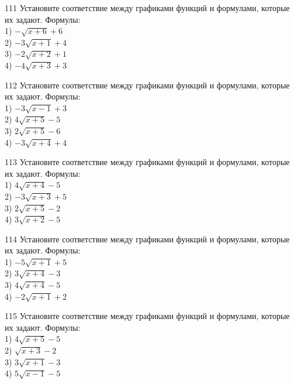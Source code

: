 \documentclass[4apaper]{article}
\begin{document}
\begin{taskBN}{111}
Установите соответствие между графиками функций и формулами, которые их задают. Формулы: \\1) $-\sqrt{x+6}+6$\\2) $-3\sqrt{x+1}+4$\\3) $-2\sqrt{x+2}+1$\\4) $-4\sqrt{x+3}+3$
\end{taskBN}

\begin{taskBN}{112}
Установите соответствие между графиками функций и формулами, которые их задают. Формулы: \\1) $-3\sqrt{x-1}+3$\\2) $4\sqrt{x+5}-5$\\3) $2\sqrt{x+5}-6$\\4) $-3\sqrt{x+4}+4$
\end{taskBN}

\begin{taskBN}{113}
Установите соответствие между графиками функций и формулами, которые их задают. Формулы: \\1) $4\sqrt{x+4}-5$\\2) $-3\sqrt{x+3}+5$\\3) $2\sqrt{x+5}-2$\\4) $3\sqrt{x+2}-5$
\end{taskBN}

\begin{taskBN}{114}
Установите соответствие между графиками функций и формулами, которые их задают. Формулы: \\1) $-5\sqrt{x+1}+5$\\2) $3\sqrt{x+4}-3$\\3) $4\sqrt{x+4}-5$\\4) $-2\sqrt{x+1}+2$
\end{taskBN}

\begin{taskBN}{115}
Установите соответствие между графиками функций и формулами, которые их задают. Формулы: \\1) $4\sqrt{x+5}-5$\\2) $\sqrt{x+3}-2$\\3) $3\sqrt{x+1}-3$\\4) $5\sqrt{x-1}-5$
\end{taskBN}
\end{document}
